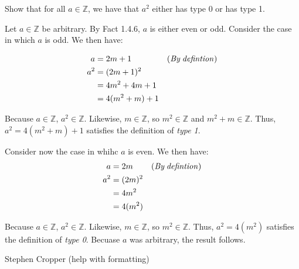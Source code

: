 \documentclass[12pt]{article}
\newenvironment{problem}[2][Problem]
{
	\begin{trivlist} 
		\item[\hskip \labelsep {\bfseries #1 #2:}]
	}
{
	\end{trivlist}
	}
\newenvironment{solution}[1][Solution]
{
	\begin{trivlist} 
		\item[\hskip \labelsep {\itshape #1:}]
	}
	{
	\end{trivlist}
}
\newenvironment{collaborators}[1][Collaborator(s)]
{
	\begin{trivlist} 
		\item[\hskip \labelsep {\bfseries #1:}]
	}
	{
	\end{trivlist}
}
\begin{document}
\begin{problem}{1}
	Show that for all $a \in \mathbb{Z}$, we have that $a^2$ either has type 0 or has type 1.
\end{problem}
\begin{solution}
	Let $a \in \mathbb{Z}$ be arbitrary. By Fact 1.4.6, $a$ is either even or odd. 
	Consider the case in which $a$ is odd. We then have:

	\begin{align*}
	a &= 2m + 1                 &  \it{(By \: defintion)}\\
	a^2 &= (2m + 1)^2\\
	&= 4m^2 + 4m +1\\
	&= 4(m^2 + m) + 1
	\end{align*}
	
	Because $a \in \mathbb{Z}$, $a^2 \in \mathbb{Z}$. Likewise, $m \in \mathbb{Z}$, so $m^2 \in \mathbb{Z}$ and $m^2 + m \in \mathbb{Z}$. Thus, $a^2 = 4(m^2+m) + 1$ satisfies the definition of {\em type 1}.
	
	Consider now the case in whihc $a$ is even. We then have:
	\begin{align*}
	a &= 2m                 &  \it{(By \: defintion)}\\
	a^2 &= (2m)^2\\
	&= 4m^2\\
	&= 4(m^2)
	\end{align*}

	Because $a \in \mathbb{Z}$, $a^2 \in \mathbb{Z}$. Likewise, $m \in \mathbb{Z}$, so $m^2 \in \mathbb{Z}$. Thus, $a^2 = 4(m^2)$ satisfies the definition of {\em type 0}. Becuase $a$ was arbitrary, the result follows.
	
\end{solution}
\begin{collaborators}
	Stephen Cropper (help with formatting)
\end{collaborators}

\newpage
\end{document}

